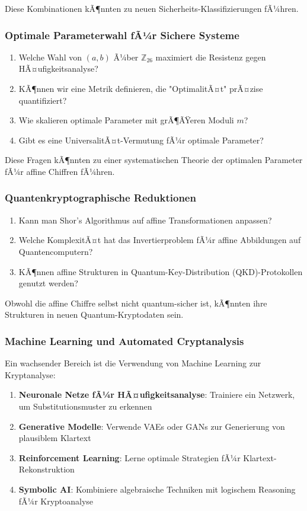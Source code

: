 ﻿\documentclass[12pt,a4paper]{article}
\begin{document}
	Diese Kombinationen kÃ¶nnten zu neuen Sicherheits-Klassifizierungen fÃ¼hren.
	
	\subsubsection{Optimale Parameterwahl fÃ¼r Sichere Systeme}
	
	\begin{enumerate}
		\item Welche Wahl von $(a, b)$ Ã¼ber $\mathbb{Z}_{26}$ maximiert die Resistenz gegen HÃ¤ufigkeitsanalyse?
		\item KÃ¶nnen wir eine Metrik definieren, die "OptimalitÃ¤t" prÃ¤zise quantifiziert?
		\item Wie skalieren optimale Parameter mit grÃ¶ÃŸeren Moduli $m$?
		\item Gibt es eine UniversalitÃ¤t-Vermutung fÃ¼r optimale Parameter?
	\end{enumerate}
	
	Diese Fragen kÃ¶nnten zu einer systematischen Theorie der optimalen Parameter fÃ¼r affine Chiffren fÃ¼hren.
	
	\subsubsection{Quantenkryptographische Reduktionen}
	
	\begin{enumerate}
		\item Kann man Shor's Algorithmus auf affine Transformationen anpassen?
		\item Welche KomplexitÃ¤t hat das Invertierproblem fÃ¼r affine Abbildungen auf Quantencomputern?
		\item KÃ¶nnen affine Strukturen in Quantum-Key-Distribution (QKD)-Protokollen genutzt werden?
	\end{enumerate}
	
	Obwohl die affine Chiffre selbst nicht quantum-sicher ist, kÃ¶nnten ihre Strukturen in neuen Quantum-Kryptodaten sein.
	
	\subsubsection{Machine Learning und Automated Cryptanalysis}
	
	Ein wachsender Bereich ist die Verwendung von Machine Learning zur Kryptanalyse:
	
	\begin{enumerate}
		\item \textbf{Neuronale Netze fÃ¼r HÃ¤ufigkeitsanalyse}: Trainiere ein Netzwerk, um Substitutionsmuster zu erkennen
		\item \textbf{Generative Modelle}: Verwende VAEs oder GANs zur Generierung von plausiblem Klartext
		\item \textbf{Reinforcement Learning}: Lerne optimale Strategien fÃ¼r Klartext-Rekonstruktion
		\item \textbf{Symbolic AI}: Kombiniere algebraische Techniken mit logischem Reasoning fÃ¼r Kryptoanalyse
	\end{enumerate}
	
\end{document}
